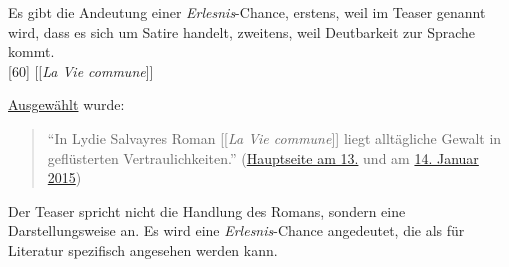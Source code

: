 \documentclass[fontsize=12pt]{scrartcl}
\begin{document}
Es gibt die Andeutung einer \textit{Erlesnis}-Chance, erstens, weil im Teaser genannt wird, dass es sich um Satire handelt, zwei\-tens, weil Deutbarkeit zur Sprache kommt. \\

[60] [[\textit{La Vie commune}]]

\href{https://de.wikipedia.org/wiki/Wikipedia_Diskussion:Hauptseite/Schon_gewusst/Diskussionsarchiv/2015/Januar#Eigenvorschlag:_La_Vie_commune_.289._Dezember.29_.28erl..29}{Ausgew\"ahlt} wurde:
\singlespacing
\begin{quote}
"`In Lydie Salvayres Roman [[\textit{La Vie commune}]] liegt allt\"agliche Gewalt in gefl\"usterten Vertraulich­kei\-ten."' (\href{https://de.wikipedia.org/wiki/Wikipedia:Hauptseite/Archiv/13._Januar_2015}{Hauptseite am 13.} und am \href{https://de.wikipedia.org/wiki/Wikipedia:Hauptseite/Archiv/14._Januar_2015}{14. Januar 2015})
\end{quote}
\onehalfspacing

Der Teaser spricht nicht die Handlung des Romans, sondern eine Darstellungsweise an. Es wird eine \textit{Erlesnis}-Chance angedeutet, die als f\"ur Li\-te\-ra\-tur spezifisch an\-ge\-sehen werden kann.
\end{document}

